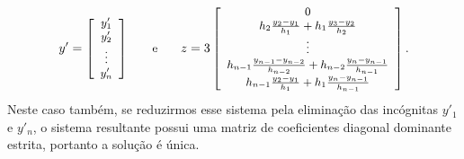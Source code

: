 \begin{equation*}
	\begin{small}
			y'= \left[\begin{array}{c}
				y'_1\\
				y'_2\\
				\vdots\\
				y'_n
		\end{array}\right]\qquad \text{e}\qquad
		z = 3\left[\begin{array}{c}
				0\\
				h_2\frac{y_2-y_1}{h_1}+h_1\frac{y_3-y_2}{h_2}\\
				\vdots\\
				h_{n-1}\frac{y_{n-1}-y_{n-2}}{h_{n-2}}+h_{n-2}\frac{y_n-y_{n-1}}{h_{n-1}}\\
				h_{n-1}\frac{y_2-y_1}{h_1}+h_1\frac{y_n-y_{n-1}}{h_{n-1}}\\
			\end{array}\right].
	\end{small}
\end{equation*}
Neste caso também, se reduzirmos esse sistema pela eliminação das incógnitas $y'_1$ e $y'_n$, o sistema resultante possui uma matriz de coeficientes diagonal dominante estrita, portanto a solução é única.



